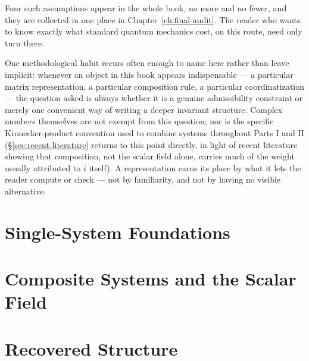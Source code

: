 \documentclass[11pt]{book}
\theoremstyle{plain}
\theoremstyle{definition}
\theoremstyle{remark}
\begin{document}
Four such assumptions appear in the whole book, no more and no fewer, and
they are collected in one place in Chapter~\ref{ch:final-audit}. The reader
who wants to know exactly what standard quantum mechanics cost, on this
route, need only turn there.

One methodological habit recurs often enough to name here rather than leave
implicit: whenever an object in this book appears indispensable — a
particular matrix representation, a particular composition rule, a
particular coordinatization — the question asked is always whether it is a
genuine admissibility constraint or merely one convenient way of writing a
deeper invariant structure. Complex numbers themselves are not exempt from
this question; nor is the specific Kronecker-product convention used to
combine systems throughout Parts I and II
(\S\ref{sec:recent-literature} returns to this point directly, in light of
recent literature showing that composition, not the scalar field alone,
carries much of the weight usually attributed to $i$ itself). A
representation earns its place by what it lets the reader compute or check —
not by familiarity, and not by having no visible alternative.

\mainmatter

\part{Single-System Foundations}







\part{Composite Systems and the Scalar Field}







\part{Recovered Structure}







\end{document}
